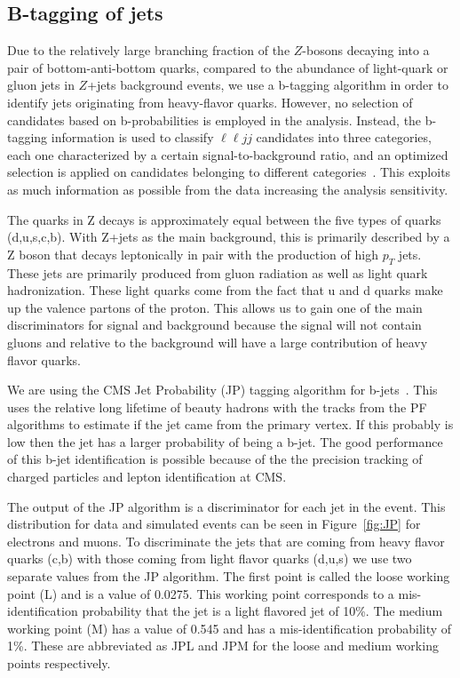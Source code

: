 \subsection{B-tagging of jets}
Due to the relatively large branching fraction of the $Z$-bosons decaying into a pair of bottom-anti-bottom quarks, compared to the abundance of light-quark or gluon jets in $Z$+jets background events, we use a b-tagging algorithm in order to identify jets originating from heavy-flavor quarks. However, no selection of candidates based on b-probabilities is employed in the analysis. Instead, the b-tagging information is used to classify $\ell \ell jj$ candidates into three categories, each one characterized by a certain signal-to-background ratio, and an optimized selection is applied on candidates belonging to different categories~\cite{CMS-AN-2011-399}. This exploits as much information as possible from the data increasing the analysis sensitivity.

The quarks in Z decays is approximately equal between the five types of quarks (d,u,s,c,b). With Z+jets as the main background, this is primarily described by a Z boson that decays leptonically in pair with the production of high $p_T$ jets. These jets are primarily produced from gluon radiation as well as light quark hadronization.  These light quarks come from the fact that u and d quarks make up the valence partons of the proton. This allows us to gain one of the main discriminators for signal and background because the signal will not contain gluons and relative to the background will have a large contribution of heavy flavor quarks.

We are using the CMS Jet Probability (JP) tagging algorithm for b-jets~\cite{CMS-PAS-BTV-11-004}.  This uses the relative long lifetime of beauty hadrons with the tracks from the PF algorithms to estimate if the jet came from the primary vertex.  If this probably is low then the jet has a larger probability of being a b-jet.  The good performance of this b-jet identification is possible because of the the precision tracking of charged particles and lepton identification at CMS.

The output of the JP algorithm is a discriminator for each jet in the event.  This distribution for data and simulated events can be seen in Figure~\ref{fig:JP} for electrons and muons.  To discriminate the jets that are coming from heavy flavor quarks (c,b) with those coming from light flavor quarks (d,u,s) we use two separate values from the JP algorithm.  The first point is called the loose working point (L) and is a value of 0.0275.  This working point corresponds to a mis-identification probability that the jet is a light flavored jet of 10\%.  The medium working point (M) has a value of 0.545 and has a mis-identification probability of 1\%.  These are abbreviated as JPL and JPM for the loose and medium working points respectively.

